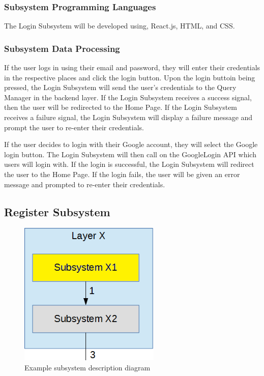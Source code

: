 \subsubsection{Subsystem Programming Languages}
The Login Subsystem will be developed using, React.js, HTML, and CSS.

\subsubsection{Subsystem Data Processing}
If the user logs in using their email and password, they will enter their credentials in the respective places and click the login button. Upon the login buttoin being pressed, the Login Subsystem will send the user's credentials to the Query Manager in the backend layer. If the Login Subsystem receives a success signal, then the user will be redirected to the Home Page. If the Login Subsystem receives a failure signal, the Login Subsystem will display a failure message and prompt the user to re-enter their credentials.

If the user decides to login with their Google account, they will select the Google login button. The Login Subsystem will then call on the GoogleLogin API which users will login with. If the login is successful, the Login Subsystem will redirect the user to the Home Page. If the login fails, the user will be given an error message and prompted to re-enter their credentials.

\subsection{Register Subsystem}

\begin{figure}[h!]
	\centering
 	\includegraphics[width=0.60\textwidth]{images/subsystem}
 \caption{Example subsystem description diagram}
\end{figure}

